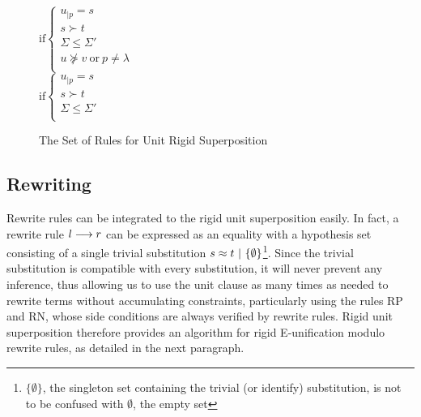 \begin{figure}[htb]
\begin{center}
\doubleLine{}
\DP
$\text{if} \left\{\begin{array}{l}
u_{|p} = s\\
s \succ t\\
\Sigma \leq \Sigma'\\
u \not\succeq v ~ \text{or} ~ p \neq \lambda\\
\end{array}\right.$\\[12pt]

\doubleLine{}
\DP
$\text{if} \left\{\begin{array}{l}
u_{|p} = s\\
s \succ t\\
\Sigma \leq \Sigma'\\
\end{array}\right.$
\caption{The Set of Rules for Unit Rigid Superposition}
\label{fig:unit-sup-rules}
\end{center}
\end{figure}

\subsection{Rewriting}

Rewrite rules can be integrated to the rigid unit superposition easily. In fact,
a rewrite rule $l\longrightarrow{}r$ can be expressed as an equality with a hypothesis set
consisting of a single trivial substitution
$s\approx{}t ~|~ \{\emptyset\}$\footnote{$\{\emptyset\}$, the
singleton set containing the trivial (or identify) substitution, is not to be confused
with $\emptyset$, the empty set}.
Since the trivial substitution is compatible
with every substitution, it will never prevent any inference, thus allowing us
to use the unit clause as many times as needed to rewrite terms without
accumulating constraints, particularly using the rules RP and RN, whose side
conditions are always verified by rewrite rules. Rigid unit superposition
therefore provides an algorithm for rigid E-unification modulo rewrite rules,
as detailed in the next paragraph.

